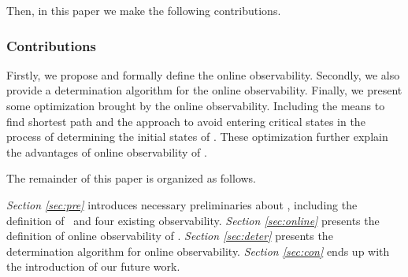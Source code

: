 Then, in this paper we make the following contributions. 
\subsubsection*{Contributions}
Firstly, we propose and formally define the online observability. %
Secondly, we also provide a determination algorithm for the online observability. Finally, we present some optimization brought by the online observability. Including the means to find shortest path and the approach to avoid entering critical states in the process of determining the initial states of \BCNs.  These optimization further explain the advantages of online observability of \BCNs. 

The remainder of this paper is organized as follows.

 {\em Section \ref{sec:pre}} introduces necessary preliminaries about \BCNs, including the definition of \BCNs\ and four existing observability. {\em Section \ref{sec:online}} presents the definition of online observability of \BCNs. {\em Section \ref{sec:deter}} presents the determination algorithm for online observability. 
 {\em Section \ref{sec:con}} ends up with the introduction of our future work.

